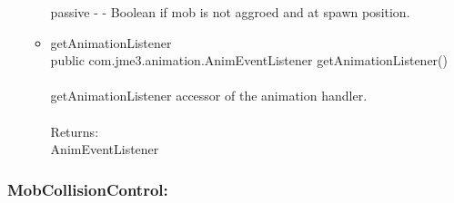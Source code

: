\documentclass[letterpaper]{article}
\begin{document}
\begin{itemize}
\begin{itemize}
											passive - - Boolean if mob is not aggroed and at spawn position.
									\item	getAnimationListener \\
											public com.jme3.animation.AnimEventListener getAnimationListener() \\ \\
											getAnimationListener accessor of the animation handler. \\ \\
											Returns: \\
											AnimEventListener
								\end{itemize}
					\end{itemize}
					
				\vspace{0.2in}
				\subsubsection*{MobCollisionControl:}
				\vspace{0.1in}	
\end{document}
